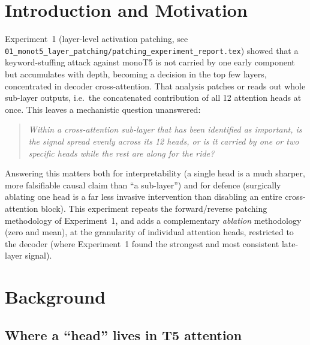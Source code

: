 \documentclass[11pt]{article}
\begin{document}
\tableofcontents
\newpage

\section{Introduction and Motivation}

Experiment~1 (layer-level activation patching, see
\texttt{01\_monot5\_layer\_patching/patching\_experiment\_report.tex}) showed
that a keyword-stuffing attack against monoT5 is not carried by one early
component but accumulates with depth, becoming a decision in the top few
layers, concentrated in decoder cross-attention. That analysis patches or
reads out whole sub-layer outputs, i.e.\ the concatenated contribution of all
12 attention heads at once. This leaves a mechanistic question unanswered:

\begin{quote}
\itshape Within a cross-attention sub-layer that has been identified as
important, is the signal spread evenly across its 12 heads, or is it carried
by one or two specific heads while the rest are along for the ride?
\end{quote}

Answering this matters both for interpretability (a single head is a much
sharper, more falsifiable causal claim than ``a sub-layer'') and for defence
(surgically ablating one head is a far less invasive intervention than
disabling an entire cross-attention block). This experiment repeats the
forward/reverse patching methodology of Experiment~1, and adds a
complementary \emph{ablation} methodology (zero and mean), at the
granularity of individual attention heads, restricted to the decoder (where
Experiment~1 found the strongest and most consistent late-layer signal).

\section{Background}

\subsection{Where a ``head'' lives in T5 attention}
\end{document}
